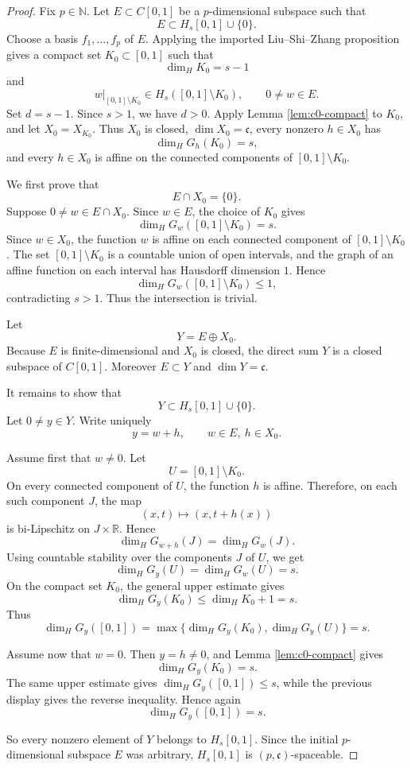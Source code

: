 \documentclass[11pt]{article}
\newcommand{\NN}{\mathbb N}
\newcommand{\RR}{\mathbb R}
\newcommand{\cc}{\mathfrak c}
\newcommand{\dimH}{\dim_{\!H}}
\begin{document}
\begin{proof}
Fix \(p\in\NN\).  Let \(E\subset C[0,1]\) be a \(p\)-dimensional subspace such that
\[
E\subset H_s[0,1]\cup\{0\}.
\]
Choose a basis \(f_1,\ldots,f_p\) of \(E\).  Applying the imported Liu--Shi--Zhang proposition gives a compact set \(K_0\subset[0,1]\) such that
\[
\dimH K_0=s-1
\]
and
\[
w|_{[0,1]\setminus K_0}\in H_s([0,1]\setminus K_0),
\qquad 0\neq w\in E.
\]
Set \(d=s-1\).  Since \(s>1\), we have \(d>0\).  Apply Lemma \ref{lem:c0-compact} to \(K_0\), and let \(X_0=X_{K_0}\).  Thus \(X_0\) is closed, \(\dim X_0=\cc\), every nonzero \(h\in X_0\) has
\[
\dimH G_h(K_0)=s,
\]
and every \(h\in X_0\) is affine on the connected components of \([0,1]\setminus K_0\).

We first prove that
\[
E\cap X_0=\{0\}.
\]
Suppose \(0\neq w\in E\cap X_0\).  Since \(w\in E\), the choice of \(K_0\) gives
\[
\dimH G_w([0,1]\setminus K_0)=s.
\]
Since \(w\in X_0\), the function \(w\) is affine on each connected component of \([0,1]\setminus K_0\).  The set \([0,1]\setminus K_0\) is a countable union of open intervals, and the graph of an affine function on each interval has Hausdorff dimension \(1\).  Hence
\[
\dimH G_w([0,1]\setminus K_0)\leq1,
\]
contradicting \(s>1\).  Thus the intersection is trivial.

Let
\[
Y=E\oplus X_0.
\]
Because \(E\) is finite-dimensional and \(X_0\) is closed, the direct sum \(Y\) is a closed subspace of \(C[0,1]\).  Moreover \(E\subset Y\) and \(\dim Y=\cc\).

It remains to show that
\[
Y\subset H_s[0,1]\cup\{0\}.
\]
Let \(0\neq y\in Y\).  Write uniquely
\[
y=w+h,\qquad w\in E,\ h\in X_0.
\]

Assume first that \(w\neq0\).  Let
\[
U=[0,1]\setminus K_0.
\]
On every connected component of \(U\), the function \(h\) is affine.  Therefore, on each such component \(J\), the map
\[
(x,t)\mapsto (x,t+h(x))
\]
is bi-Lipschitz on \(J\times\RR\).  Hence
\[
\dimH G_{w+h}(J)=\dimH G_w(J).
\]
Using countable stability over the components \(J\) of \(U\), we get
\[
\dimH G_y(U)=\dimH G_w(U)=s.
\]
On the compact set \(K_0\), the general upper estimate gives
\[
\dimH G_y(K_0)\leq \dimH K_0+1=s.
\]
Thus
\[
\dimH G_y([0,1])
=\max\{\dimH G_y(K_0),\dimH G_y(U)\}=s.
\]

Assume now that \(w=0\).  Then \(y=h\neq0\), and Lemma \ref{lem:c0-compact} gives
\[
\dimH G_y(K_0)=s.
\]
The same upper estimate gives \(\dimH G_y([0,1])\leq s\), while the previous display gives the reverse inequality.  Hence again
\[
\dimH G_y([0,1])=s.
\]

So every nonzero element of \(Y\) belongs to \(H_s[0,1]\).  Since the initial \(p\)-dimensional subspace \(E\) was arbitrary, \(H_s[0,1]\) is \((p,\cc)\)-spaceable.
\end{proof}
\end{document}
